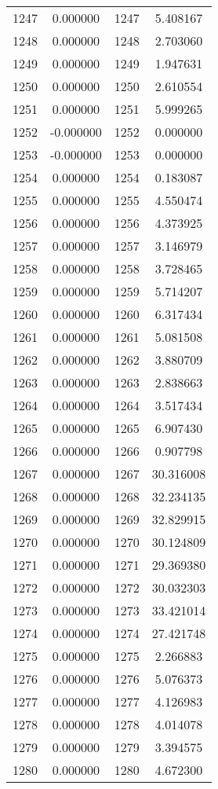 \documentclass[12pt]{article}
\begin{document}
\begin{longtable}{@{}cccc@{}}
1247 & 0.000000 & 1247 & 5.408167 \\
1248 & 0.000000 & 1248 & 2.703060 \\
1249 & 0.000000 & 1249 & 1.947631 \\
1250 & 0.000000 & 1250 & 2.610554 \\
1251 & 0.000000 & 1251 & 5.999265 \\
1252 & -0.000000 & 1252 & 0.000000 \\
1253 & -0.000000 & 1253 & 0.000000 \\
1254 & 0.000000 & 1254 & 0.183087 \\
1255 & 0.000000 & 1255 & 4.550474 \\
1256 & 0.000000 & 1256 & 4.373925 \\
1257 & 0.000000 & 1257 & 3.146979 \\
1258 & 0.000000 & 1258 & 3.728465 \\
1259 & 0.000000 & 1259 & 5.714207 \\
1260 & 0.000000 & 1260 & 6.317434 \\
1261 & 0.000000 & 1261 & 5.081508 \\
1262 & 0.000000 & 1262 & 3.880709 \\
1263 & 0.000000 & 1263 & 2.838663 \\
1264 & 0.000000 & 1264 & 3.517434 \\
1265 & 0.000000 & 1265 & 6.907430 \\
1266 & 0.000000 & 1266 & 0.907798 \\
1267 & 0.000000 & 1267 & 30.316008 \\
1268 & 0.000000 & 1268 & 32.234135 \\
1269 & 0.000000 & 1269 & 32.829915 \\
1270 & 0.000000 & 1270 & 30.124809 \\
1271 & 0.000000 & 1271 & 29.369380 \\
1272 & 0.000000 & 1272 & 30.032303 \\
1273 & 0.000000 & 1273 & 33.421014 \\
1274 & 0.000000 & 1274 & 27.421748 \\
1275 & 0.000000 & 1275 & 2.266883 \\
1276 & 0.000000 & 1276 & 5.076373 \\
1277 & 0.000000 & 1277 & 4.126983 \\
1278 & 0.000000 & 1278 & 4.014078 \\
1279 & 0.000000 & 1279 & 3.394575 \\
1280 & 0.000000 & 1280 & 4.672300 \\

\end{longtable}
\end{document}
